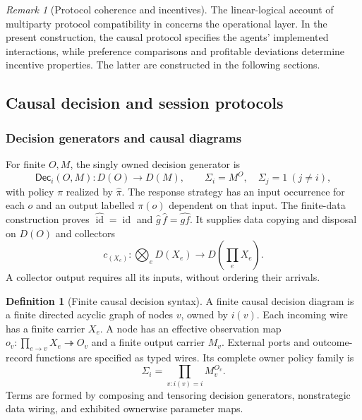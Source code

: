 \documentclass[11pt,a4paper]{article}
\numberwithin{equation}{section}
\theoremstyle{definition}
\newtheorem{definition}[theorem]{Definition}
\theoremstyle{remark}
\newtheorem{remark}[theorem]{Remark}
\theoremstyle{plain}
\providecommand{\Dec}{\mathsf{Dec}}
\providecommand{\id}{\mathop{\mathrm{id}}}
\begin{document}
\begin{remark}[Protocol coherence and incentives]
The linear-logical account of multiparty protocol compatibility in
\citet{CarboneEtAl2015,CarboneEtAl2016} concerns the operational layer.
In the present construction, the causal protocol specifies the agents' implemented interactions,
while preference comparisons and profitable deviations determine incentive
properties. The latter are constructed in the following sections.
\end{remark}

\subsection{Causal decision and session protocols}
\label{agt-sec-protocols}

\subsubsection{Decision generators and causal diagrams}

For finite $O,M$, the singly owned decision generator is
\[
 \Dec_i(O,M):D(O)\to D(M),\qquad
 \Sigma_i=M^O,\quad\Sigma_j=1\ (j\ne i),
\]
with policy $\pi$ realized by $\widehat\pi$. The response strategy has an
input occurrence for each $o$ and an output labelled $\pi(o)$ dependent
on that input. The finite-data construction proves
$\widehat{\id}=\id$ and $\widehat g\,\widehat f=\widehat{gf}$.
It supplies data copying and disposal on $D(O)$ and collectors
\[
 c_{(X_e)}:\bigotimes_eD(X_e)\to D\left(\prod_eX_e\right).
\]
A collector output requires all its inputs, without ordering their arrivals.

\begin{definition}[Finite causal decision syntax]
A finite causal decision diagram is a finite directed acyclic graph of
nodes $v$, owned by $i(v)$. Each incoming wire has a finite carrier $X_e$.
A node has an effective observation map
$o_v:\prod_{e\to v}X_e\twoheadrightarrow O_v$ and a finite output carrier
$M_v$. External ports and outcome-record functions are specified as typed
wires. Its complete owner policy family is
\[
 \Sigma_i=\prod_{v:i(v)=i}M_v^{O_v}.
\]
Terms are formed by composing and tensoring decision generators,
nonstrategic data wiring, and exhibited ownerwise parameter maps.
\end{definition}
\end{document}

